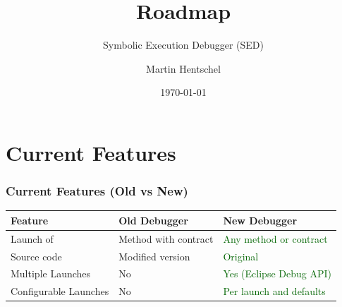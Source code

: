 \documentclass[accentcolor=tud9d,colorbacktitle,inverttitle,landscape,english,presentation,t]{tudbeamer}
\begin{document}
\title{Roadmap}
\subtitle{Symbolic Execution Debugger (SED)}

\author{Martin Hentschel}


\date{\today}

\begin{titleframe}
\end{titleframe}


\section{Current Features}

	\begin{frame}[t]
		\frametitle{Current Features (Old vs New)}
      
      \begin{table}
         \centering
            \begin{tabular}{|l|l|l|}
               \hline
               Feature & Old Debugger & New Debugger \\
               \hline
               \hline
               Launch of & Method with contract & \textcolor{darkgreen}{Any method or contract} \\
               Source code & Modified version & \textcolor{darkgreen}{Original} \\
               Multiple Launches & No & \textcolor{darkgreen}{Yes (Eclipse Debug API)} \\
               Configurable Launches & No & \textcolor{darkgreen}{Per launch and defaults} \\
               \hline
            \end{tabular}
      \end{table}
	\end{frame}
   
\end{document}
